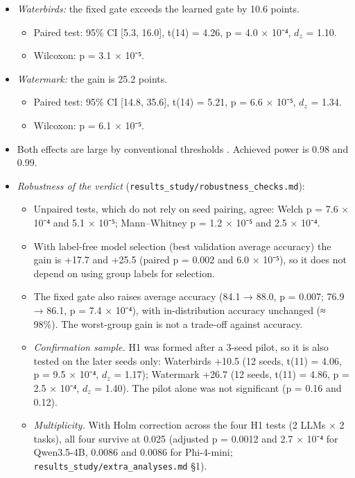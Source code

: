 \begin{itemize}
\tightlist
\item
  \emph{Waterbirds:} the fixed gate exceeds the learned gate by 10.6 points.

  \begin{itemize}
  \tightlist
  \item
    Paired test: 95\% CI {[}5.3, 16.0{]}, t(14) = 4.26, p = 4.0 × 10⁻⁴, \(d_z\) = 1.10.
  \item
    Wilcoxon: p = 3.1 × 10⁻⁵.
  \end{itemize}
\item
  \emph{Watermark:} the gain is 25.2 points.

  \begin{itemize}
  \tightlist
  \item
    Paired test: 95\% CI {[}14.8, 35.6{]}, t(14) = 5.21, p = 6.6 × 10⁻⁵, \(d_z\) = 1.34.
  \item
    Wilcoxon: p = 6.1 × 10⁻⁵.
  \end{itemize}
\item
  Both effects are large by conventional thresholds \cite{cohen1988power}. Achieved power is 0.98 and 0.99.
\item
  \emph{Robustness of the verdict} (\texttt{results\_study/robustness\_checks.md}):

  \begin{itemize}
  \item
    Unpaired tests, which do not rely on seed pairing, agree: Welch p = 7.6 × 10⁻⁴ and 5.1 × 10⁻⁵;
    Mann--Whitney p = 1.2 × 10⁻⁵ and 2.5 × 10⁻⁴.
  \item
    With label-free model selection (best validation average accuracy) the gain is +17.7 and +25.5
    (paired p = 0.002 and 6.0 × 10⁻⁵), so it does not depend on using group labels for selection.
  \item
    The fixed gate also raises average accuracy (84.1 → 88.0, p = 0.007; 76.9 → 86.1, p = 7.4 × 10⁻⁴), with
    in-distribution accuracy unchanged (≈ 98\%). The worst-group gain is not a trade-off against accuracy.
  \item
    \emph{Confirmation sample.} H1 was formed after a 3-seed pilot, so it is also tested on the later seeds only:
    Waterbirds +10.5 (12 seeds, t(11) = 4.06, p = 9.5 × 10⁻⁴, \(d_z\) = 1.17); Watermark +26.7 (12 seeds,
    t(11) = 4.86, p = 2.5 × 10⁻⁴, \(d_z\) = 1.40). The pilot alone was not significant (p = 0.16 and 0.12).
  \item
    \emph{Multiplicity.} With Holm correction across the four H1 tests (2 LLMs × 2 tasks), all four survive at 0.025
    (adjusted p = 0.0012 and 2.7 × 10⁻⁴ for Qwen3.5-4B, 0.0086 and 0.0086 for Phi-4-mini;
    \texttt{results\_study/extra\_analyses.md} §1).
  \end{itemize}
\end{itemize}

